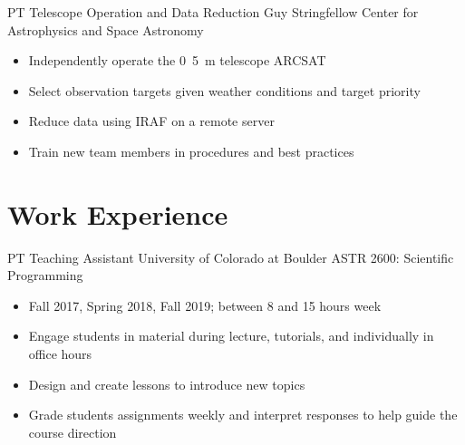 \documentclass[10pt]{article} %
\begin{document}
\begin{paracol}{2}
{PT} %
{Telescope Operation and Data Reduction} %
{Guy Stringfellow} %
{Center for Astrophysics and Space Astronomy}
{\begin{itemize}
\setlength\itemsep{0.1em}
\item Independently operate the \si{0.5\meter} telescope ARCSAT
\item Select observation targets given weather conditions and target priority
\item Reduce data using IRAF on a remote server
\item Train new team members in procedures and best practices
\end{itemize}
}

\medskip
\section{Work Experience}




    {PT} %
    {Teaching Assistant} %
    {University of Colorado at Boulder} %
    {ASTR 2600: Scientific Programming}
    {\begin{itemize}
    \setlength\itemsep{0.1em} 
        \item Fall 2017, Spring 2018, Fall 2019; between 8 and 15 hours week
        \item Engage students in material during lecture, tutorials, and individually in office hours
        \item Design and create lessons to introduce new topics
        \item Grade students assignments weekly and interpret responses to help guide the course direction
    \end{itemize}} %

\switchcolumn
\medskip

\end{paracol}
\end{document}
